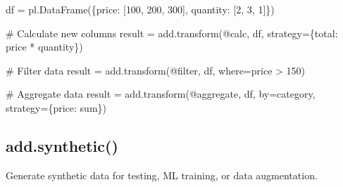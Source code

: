 \documentclass[
  letterpaper,
]{scrbook}
\newenvironment{Shaded}{\begin{snugshade}}{\end{snugshade}}
\newcommand{\CommentTok}[1]{\textcolor[rgb]{0.37,0.37,0.37}{#1}}
\newcommand{\DecValTok}[1]{\textcolor[rgb]{0.68,0.00,0.00}{#1}}
\newcommand{\NormalTok}[1]{\textcolor[rgb]{0.00,0.23,0.31}{#1}}
\newcommand{\OperatorTok}[1]{\textcolor[rgb]{0.37,0.37,0.37}{#1}}
\newcommand{\StringTok}[1]{\textcolor[rgb]{0.13,0.47,0.30}{#1}}
\begin{document}
\begin{Shaded}
\begin{Highlighting}[]
\NormalTok{df }\OperatorTok{=}\NormalTok{ pl.DataFrame(\{}\StringTok{\textquotesingle{}price\textquotesingle{}}\NormalTok{: [}\DecValTok{100}\NormalTok{, }\DecValTok{200}\NormalTok{, }\DecValTok{300}\NormalTok{], }\StringTok{\textquotesingle{}quantity\textquotesingle{}}\NormalTok{: [}\DecValTok{2}\NormalTok{, }\DecValTok{3}\NormalTok{, }\DecValTok{1}\NormalTok{]\})}

\CommentTok{\# Calculate new columns}
\NormalTok{result }\OperatorTok{=}\NormalTok{ add.transform(}\StringTok{\textquotesingle{}@calc\textquotesingle{}}\NormalTok{, df, strategy}\OperatorTok{=}\NormalTok{\{}\StringTok{\textquotesingle{}total\textquotesingle{}}\NormalTok{: }\StringTok{\textquotesingle{}price * quantity\textquotesingle{}}\NormalTok{\})}

\CommentTok{\# Filter data}
\NormalTok{result }\OperatorTok{=}\NormalTok{ add.transform(}\StringTok{\textquotesingle{}@filter\textquotesingle{}}\NormalTok{, df, where}\OperatorTok{=}\StringTok{\textquotesingle{}price \textgreater{} 150\textquotesingle{}}\NormalTok{)}

\CommentTok{\# Aggregate data}
\NormalTok{result }\OperatorTok{=}\NormalTok{ add.transform(}\StringTok{\textquotesingle{}@aggregate\textquotesingle{}}\NormalTok{, df, by}\OperatorTok{=}\StringTok{\textquotesingle{}category\textquotesingle{}}\NormalTok{, strategy}\OperatorTok{=}\NormalTok{\{}\StringTok{\textquotesingle{}price\textquotesingle{}}\NormalTok{: }\StringTok{\textquotesingle{}sum\textquotesingle{}}\NormalTok{\})}
\end{Highlighting}
\end{Shaded}

\subsection{add.synthetic()}\label{add.synthetic}

Generate synthetic data for testing, ML training, or data augmentation.
\end{document}

